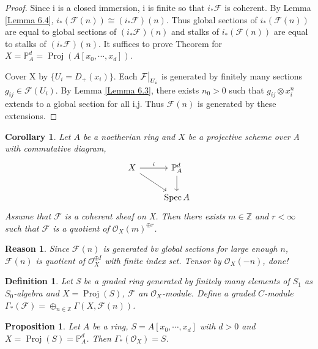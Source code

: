 \documentclass{ctexart}
\newtheorem{definition}{Definition}[section]
\newtheorem{proposition}{Proposition}[section]
\newtheorem{reason}{Reason}[section]
\newtheorem{corollary}{Corollary}[section]
\newcommand{\spec}{\operatorname{Spec}}
\newcommand{\proj}{\operatorname{Proj}}
\begin{document}
\begin{proof}
    Since i is a closed immersion, i is finite so that $i_{\ast}\mathcal{F}$ is coherent.
    By Lemma \ref{Lemma 6.4}, $i_{\ast}(\mathcal{F}(n)) \cong (i_{\ast}\mathcal{F})(n)$.
    Thus global sections of $i_{\ast}(\mathcal{F}(n))$ are equal to global sections of $(i_{\ast}\mathcal{F})(n)$ and stalks of $i_{\ast}(\mathcal{F}(n))$ are equal to stalks of $(i_{\ast}\mathcal{F})(n)$.
    It suffices to prove Theorem for $X = \mathbb{P}_{A}^{d} = \proj(A[x_{0}, \cdots, x_{d}])$.
    \par
    Cover X by $\{U_{i} = D_{+}(x_{i})\}$.
    Each $\mathcal{F}\big{|}_{U_{i}}$ is generated by finitely many sections $g_{ij}\in \mathcal{F}(U_{i})$.
    By Lemma \ref{Lemma 6.3}, there exists $n_{0} > 0$ such that $g_{ij} \otimes x_{i}^{n}$ extends to a global section for all i,j.
    Thus $\mathcal{F}(n)$ is generated by these extensions.
\end{proof}
\begin{corollary}
    Let $A$ be a noetherian ring and $X$ be a projective scheme over A with commutative diagram, 
    \begin{equation*}
        \begin{tikzcd}
            X \arrow[r, "i"] \arrow[dr] &
            \mathbb{P}_{A}^{d} \arrow[d] \\
            & \spec A
        \end{tikzcd}
    \end{equation*}
    Assume that $\mathcal{F}$ is a coherent sheaf on X.
    Then there exists $m\in \mathbb{Z}$ and $r < \infty$ such that $\mathcal{F}$ is a quotient of $\mathcal{O}_{X}(m)^{\oplus r}$.
    \label{Corollary 6.1}
\end{corollary}
\begin{reason}
    Since $\mathcal{F}(n)$ is generated bv global sections for large enough $n$,
    $\mathcal{F}(n)$ is quotient of $\mathcal{O}_{X}^{\oplus I}$ with finite index set.
    Tensor by $\mathcal{O}_{X}(-n)$, done!
\end{reason}
\begin{definition}
    Let S be a graded ring generated by finitely many elements of $S_{1}$ as $S_{0}$-algebra and $X = \proj(S)$, $\mathcal{F}$ an $\mathcal{O}_{X}$-module.
    Define a graded $C$-module $\Gamma_{\ast}(\mathcal{F}) = \oplus_{n\in \mathbb{Z}} \Gamma(X, \mathcal{F}(n))$.
\end{definition}
\begin{proposition}
    Let $A$ be a ring, $S = A[x_{0}, \cdots, x_{d}]$ with $d > 0$ and $X = \proj(S) = \mathbb{P}_{A}^{d}$.
    Then $\Gamma_{\ast}(\mathcal{O}_{X}) = S$.
    \label{Proposition 6.9}
\end{proposition}
\end{document}
